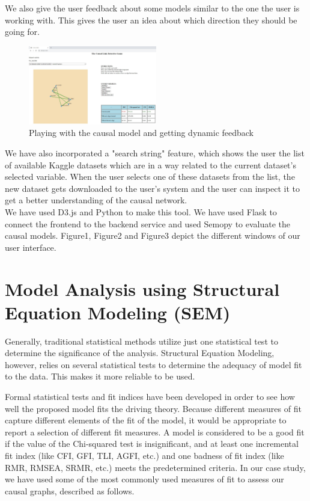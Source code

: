 \documentclass{vgtc}                          %
\begin{document}
We also give the user feedback about some models similar to the one the user is working with. This gives the user an idea about which direction they should be going for.

\begin{figure}[H]
  \caption{Playing with the causal model and getting dynamic feedback}
  \centering
  \includegraphics[width=0.5\textwidth]{s3}
\end{figure}

We have also incorporated a "search string" feature, which shows the user the list of available Kaggle datasets which are in a way related to the current dataset's selected variable. When the user selects one of these datasets from the list, the new dataset gets downloaded to the user's system and the user can inspect it to get a better understanding of the causal network.
\\[1em]
We have used D3.js and Python to make this tool. We have used Flask to connect the frontend to the backend service and used Semopy to evaluate the causal models. Figure1, Figure2 and Figure3 depict the different windows of our user interface.



\section{Model Analysis using Structural Equation Modeling (SEM)}

Generally, traditional statistical methods utilize just one statistical test to determine the significance of the analysis. Structural Equation Modeling, however, relies on several statistical tests to determine the adequacy of model fit to the data. This makes it more reliable to be used.

Formal statistical tests and fit indices have been developed in order to see how well the proposed model fits the driving theory. Because different measures of fit capture different elements of the fit of the model, it would be appropriate to report a selection of different fit measures.  A model is considered to be a good fit if the value of the Chi-squared test is insignificant, and at least one incremental fit index (like CFI, GFI, TLI, AGFI, etc.) and one badness of fit index (like RMR, RMSEA, SRMR, etc.) meets the predetermined criteria.
In our case study, we have used some of the most commonly used measures of fit to assess our causal graphs, described as follows.
\end{document}
